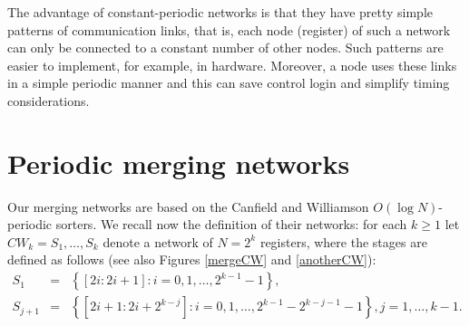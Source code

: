 \documentclass{llncs}
\newcommand{\braced}[1]{{\left\{#1\right\}}}
\begin{document}
The advantage of constant-periodic networks is that they have pretty
simple patterns of communication links, that is, each node (register)
of such a network can only be connected to a constant number of other
nodes. Such patterns are easier to implement, for example, in hardware.
Moreover, a node uses these links in a simple periodic manner and this
can save control login and simplify timing considerations.

\section{Periodic merging networks}

Our merging networks are based on the Canfield and Williamson \cite{cw}
$O(\log N)$-periodic sorters. We recall now the definition of their
networks: for each $k\ge 1$ let $CW_k=S_1,\ldots,S_k$ denote a network of
$N=2^k$ registers, where the stages are defined as follows (see also
Figures \ref{mergeCW} and \ref{anotherCW}):
\begin{eqnarray}
S_1 & = & \braced{[2i:2i+1]: i=0,1,\ldots,2^{k-1}-1}, \\
S_{j+1} & = & \braced{[2i+1:2i+2^{k-j}]:
  i=0,1,\ldots,2^{k-1}-2^{k-j-1}-1}, j=1,\ldots,k-1.
\end{eqnarray}
\end{document}
